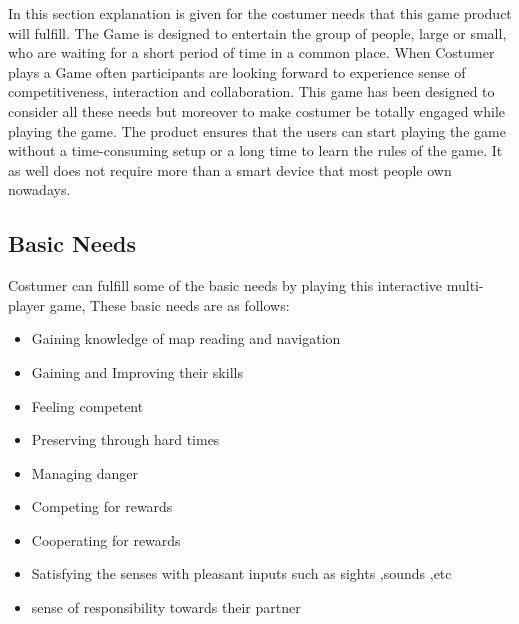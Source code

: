 

In this section explanation is given for the costumer needs that this game product will fulfill. The Game  is designed to entertain the group of people, large or small, who are waiting for a short period of time in a common place. When Costumer plays a Game often participants are looking forward to experience sense of competitiveness, interaction and collaboration. This game has been designed to consider all these needs but moreover to make costumer be totally engaged while playing the game. The product ensures that the users can start playing the game without a time-consuming setup or a long time to learn the rules of the game. It as
 well does not require more than a smart device that most people own nowadays. 
 \subsection{Basic Needs}

 Costumer can fulfill some of the basic needs by playing this interactive multi-player game, These basic needs are as follows:
 \begin{itemize}
   	\item Gaining knowledge of map reading and navigation
   	\item Gaining and Improving their skills
   	\item Feeling competent
   	\item Preserving through hard times
   	\item Managing danger
   	\item Competing for rewards
   	\item Cooperating for rewards
   	\item Satisfying the senses with pleasant inputs such as sights ,sounds ,etc
   	\item sense of responsibility towards their partner
   \end{itemize}  


     